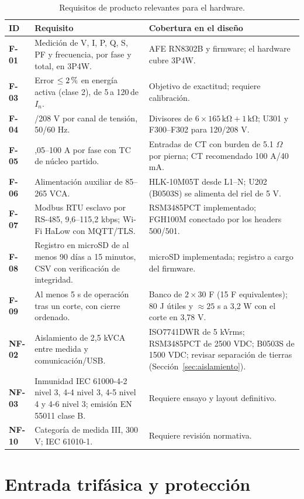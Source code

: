 \documentclass[11pt,a4paper]{article}
\newcommand{\pct}{\text{\char37}}
\begin{document}
\begin{table}[H]
\centering
\caption{Requisitos de producto relevantes para el hardware.}
\label{tab:requisitos}
\footnotesize
\begin{tabularx}{\textwidth}{@{}>{\bfseries}p{1.0cm} >{\raggedright\arraybackslash}p{6.3cm} X@{}}
\toprule
\textbf{ID} & \textbf{Requisito} & \textbf{Cobertura en el diseño} \\
\midrule
F-01 & Medición de V, I, P, Q, S, PF y frecuencia, por fase y total, en 3P4W. & AFE RN8302B y firmware; el hardware cubre 3P4W. \\
F-03 & Error $\leq 2\,\pct$ en energía activa (clase 2), de 5\,\pct a 120\,\pct de $I_n$. & Objetivo de exactitud; requiere calibración. \\
F-04 & 120/208 V por canal de tensión, 50/60 Hz. & Divisores de $6\times165\,\mathrm{k\Omega}+1\,\mathrm{k\Omega}$; U301 y F300--F302 para 120/208 V. \\
F-05 & 0,05--100 A por fase con TC de núcleo partido. & Entradas de CT con burden de 5.1 $\Omega$ por pierna; CT recomendado 100 A/40 mA. \\
F-06 & Alimentación auxiliar de 85--265 VCA. & HLK-10M05T desde L1--N; U202 (B0503S) se alimenta del riel de 5 V. \\
F-07 & Modbus RTU esclavo por RS-485, 9,6--115,2 kbps; Wi-Fi HaLow con MQTT/TLS. & RSM3485PCT implementado; FGH100M conectado por los headers 500/501. \\
F-08 & Registro en microSD de al menos 90 días a 15 minutos, CSV con verificación de integridad. & microSD implementada; registro a cargo del firmware. \\
F-09 & Al menos 5 s de operación tras un corte, con cierre ordenado. & Banco de $2\times30$ F (15 F equivalentes); 80 J útiles y $\approx25$ s a 3,2 W con el corte en 3,78 V. \\
NF-02 & Aislamiento de 2,5 kVCA entre medida y comunicación/USB. & ISO7741DWR de 5 kVrms; RSM3485PCT de 2500 VDC; B0503S de 1500 VDC; revisar separación de tierras (Sección~\ref{sec:aislamiento}). \\
NF-03 & Inmunidad IEC 61000-4-2 nivel 3, 4-4 nivel 3, 4-5 nivel 4 y 4-6 nivel 3; emisión EN 55011 clase B. & Requiere ensayo y layout definitivo. \\
NF-10 & Categoría de medida III, 300 V; IEC 61010-1. & Requiere revisión normativa. \\
\bottomrule
\end{tabularx}
\end{table}
\section{Entrada trifásica y protección}
\label{sec:entrada}
\end{document}
